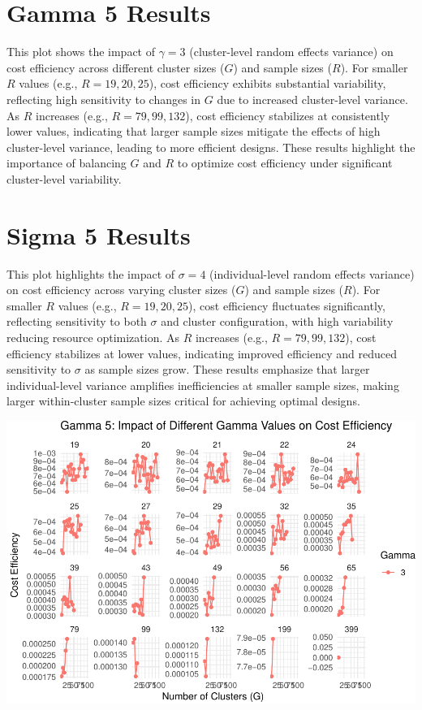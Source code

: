 \documentclass[
]{article}
\begin{document}
\hypertarget{gamma-5-results}{%
\section{Gamma 5 Results}\label{gamma-5-results}}

This plot shows the impact of \(\gamma = 3\) (cluster-level random
effects variance) on cost efficiency across different cluster sizes
(\(G\)) and sample sizes (\(R\)). For smaller \(R\) values (e.g.,
\(R = 19, 20, 25\)), cost efficiency exhibits substantial variability,
reflecting high sensitivity to changes in \(G\) due to increased
cluster-level variance. As \(R\) increases (e.g., \(R = 79, 99, 132\)),
cost efficiency stabilizes at consistently lower values, indicating that
larger sample sizes mitigate the effects of high cluster-level variance,
leading to more efficient designs. These results highlight the
importance of balancing \(G\) and \(R\) to optimize cost efficiency
under significant cluster-level variability.

\hypertarget{sigma-5-results}{%
\section{Sigma 5 Results}\label{sigma-5-results}}

This plot highlights the impact of \(\sigma = 4\) (individual-level
random effects variance) on cost efficiency across varying cluster sizes
(\(G\)) and sample sizes (\(R\)). For smaller \(R\) values (e.g.,
\(R = 19, 20, 25\)), cost efficiency fluctuates significantly,
reflecting sensitivity to both \(\sigma\) and cluster configuration,
with high variability reducing resource optimization. As \(R\) increases
(e.g., \(R = 79, 99, 132\)), cost efficiency stabilizes at lower values,
indicating improved efficiency and reduced sensitivity to \(\sigma\) as
sample sizes grow. These results emphasize that larger individual-level
variance amplifies inefficiencies at smaller sample sizes, making larger
within-cluster sample sizes critical for achieving optimal designs.

\begin{center}\includegraphics{Project3Simulation_files/figure-latex/unnamed-chunk-14-1} \end{center}
\end{document}
